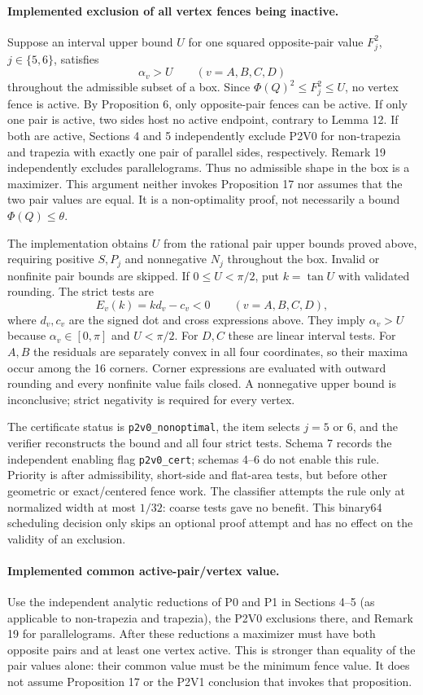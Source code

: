 \documentclass[11pt]{article}
\begin{document}
\paragraph{Implemented exclusion of all vertex fences being inactive.}
Suppose an interval upper bound $U$ for one squared opposite-pair value
$F_j^2$, $j\in\{5,6\}$, satisfies
\[
       \alpha_v>U\qquad(v=A,B,C,D)
\]
throughout the admissible subset of a box. Since $\Phi(Q)^2\le F_j^2\le U$,
no vertex fence is active. By Proposition 6, only opposite-pair fences can
be active. If only one pair is active, two sides host no active endpoint,
contrary to Lemma 12. If both are active, Sections 4 and 5 independently
exclude P2V0 for non-trapezia and trapezia with exactly one pair of parallel
sides, respectively. Remark 19 independently excludes parallelograms.
Thus no admissible shape in the box is a maximizer. This argument neither
invokes Proposition 17 nor assumes that the two pair values are equal.
It is a non-optimality proof, not necessarily a bound $\Phi(Q)\le\theta$.

The implementation obtains $U$ from the rational pair upper bounds proved
above, requiring positive $S,P_j$ and nonnegative $N_j$ throughout the box.
Invalid or nonfinite pair bounds are skipped. If $0\le U<\pi/2$, put
$k=\tan U$ with validated rounding. The strict tests are
\[
           E_v(k)=k d_v-c_v<0\qquad(v=A,B,C,D),
\]
where $d_v,c_v$ are the signed dot and cross expressions above.
They imply $\alpha_v>U$ because $\alpha_v\in[0,\pi]$ and $U<\pi/2$.
For $D,C$ these are linear interval tests. For $A,B$ the residuals are
separately convex in all four coordinates, so their maxima occur among the
16 corners. Corner expressions are evaluated with outward rounding and
every nonfinite value fails closed. A nonnegative upper bound is inconclusive;
strict negativity is required for every vertex.

The certificate status is \texttt{p2v0\_nonoptimal}, the item selects $j=5$ or
$6$, and the verifier reconstructs the bound and all four strict tests.
Schema 7 records the independent enabling flag \texttt{p2v0\_cert}; schemas
4--6 do not enable this rule. Priority is after admissibility, short-side and
flat-area tests, but before other geometric or exact/centered fence work.
The classifier attempts the rule only at normalized width at most $1/32$:
coarse tests gave no benefit. This binary64 scheduling decision only skips
an optional proof attempt and has no effect on the validity of an exclusion.

\paragraph{Implemented common active-pair/vertex value.}
Use the independent analytic reductions of P0 and P1 in Sections 4--5
(as applicable to non-trapezia and trapezia), the P2V0 exclusions there,
and Remark 19 for parallelograms.
After these reductions a maximizer must have both opposite pairs and at
least one vertex active. This is stronger than equality of the pair values
alone: their common value must be the minimum fence value. It does not
assume Proposition 17 or the P2V1 conclusion that invokes that proposition.
\end{document}
